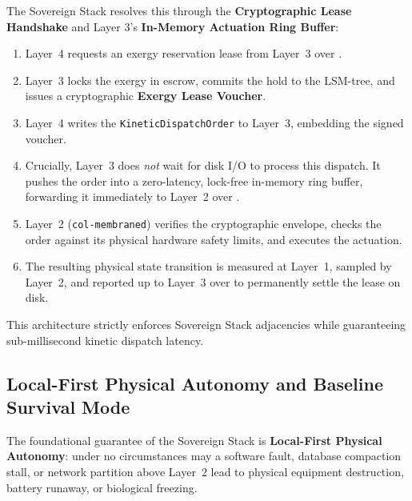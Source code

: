 The Sovereign Stack resolves this through the \textbf{Cryptographic Lease Handshake} and Layer 3's \textbf{In-Memory Actuation Ring Buffer}:
\begin{enumerate}
    \item Layer~4 requests an exergy reservation lease from Layer~3 over .
    \item Layer~3 locks the exergy in escrow, commits the hold to the LSM-tree, and issues a cryptographic \textbf{Exergy Lease Voucher}.
    \item Layer~4 writes the \texttt{KineticDispatchOrder} to Layer~3, embedding the signed voucher.
    \item Crucially, Layer~3 does \textit{not} wait for disk I/O to process this dispatch. It pushes the order into a zero-latency, lock-free in-memory ring buffer, forwarding it immediately to Layer~2 over .
    \item Layer~2 (\texttt{col-membraned}) verifies the cryptographic envelope, checks the order against its physical hardware safety limits, and executes the actuation.
    \item The resulting physical state transition is measured at Layer~1, sampled by Layer~2, and reported up to Layer~3 over  to permanently settle the lease on disk.
\end{enumerate}
This architecture strictly enforces Sovereign Stack adjacencies while guaranteeing sub-millisecond kinetic dispatch latency.

\subsection{Local-First Physical Autonomy and Baseline Survival Mode}

The foundational guarantee of the Sovereign Stack is \textbf{Local-First Physical Autonomy}: under no circumstances may a software fault, database compaction stall, or network partition above Layer~2 lead to physical equipment destruction, battery runaway, or biological freezing.

